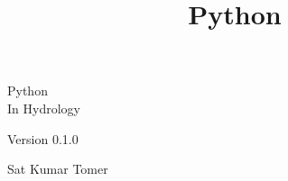\documentclass[10pt]{book}
\title{Python}
\newcommand{\theversion}{0.1.0}
\begin{document}

\frontmatter




\newtheorem{ex}{Exercise}[chapter]

\begin{latexonly}

\renewcommand{\blankpage}{\thispagestyle{empty} \quad \newpage}



\thispagestyle{empty}

\begin{flushright}
\vspace*{2.0in}


\vspace{0.25in}


\vfill

\end{flushright}


\blankpage

\pagebreak
\thispagestyle{empty}

\begin{flushright}
\vspace*{2.0in}

\begin{spacing}{3}
{\Huge Python}\\
{\large In Hydrology}
\end{spacing}

\vspace{0.25in}

Version \theversion

\vspace{1in}


{\huge Sat Kumar Tomer } \vspace{0.15in} \\ 




\end{flushright}
\end{latexonly}
\end{document}
